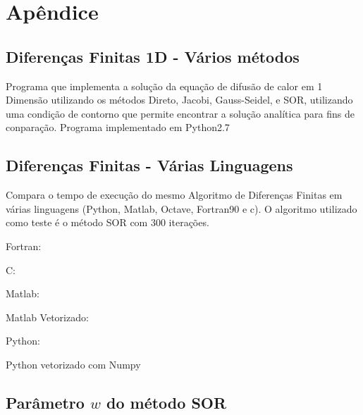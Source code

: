 \chapter{Apêndice}\label{apêndice}

\section{Diferenças Finitas 1D - Vários métodos}\label{alg:dif1d}

Programa que implementa a solução da equação de difusão de calor em 1 Dimensão utilizando os métodos Direto, Jacobi, Gauss-Seidel, e SOR, utilizando uma condição de contorno que permite encontrar a solução analítica para fins de conparação. Programa implementado em Python2.7

\singlespacing

\doublespacing

\section{Diferenças Finitas - Várias Linguagens}\label{alg:linguagens}

Compara o tempo de execução do mesmo Algoritmo de Diferenças Finitas em várias linguagens (Python, Matlab, Octave, Fortran90 e c). O algoritmo utilizado como teste é o método SOR com 300 iterações.

Fortran:

\singlespacing


C:



Matlab:



Matlab Vetorizado:



Python:



Python vetorizado com Numpy



\doublespacing

\section{Parâmetro $w$ do método SOR}\label{alg:sor}


